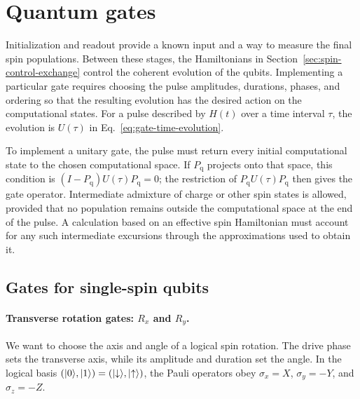 \section{Quantum gates}
\label{sec:quantum-gates}
\label{sec:hamiltonians-to-gates}

Initialization and readout provide a known input and a way to
measure the final spin populations. Between these stages, the
Hamiltonians in Section~\ref{sec:spin-control-exchange} control the
coherent evolution of the qubits. Implementing a particular gate
requires choosing the pulse amplitudes, durations, phases, and
ordering so that the resulting evolution has the desired action
on the computational states. For a pulse described by $H(t)$ over
a time interval $\tau$, the evolution is $U(\tau)$ in
Eq.~\eqref{eq:gate-time-evolution}.

To implement a unitary gate, the pulse must return every initial
computational state to the chosen computational space. If
$P_{\mathrm q}$ projects onto that space, this condition is
$(I-P_{\mathrm q})U(\tau)P_{\mathrm q}=0$; the restriction of
$P_{\mathrm q}U(\tau)P_{\mathrm q}$ then gives the gate operator.
Intermediate admixture of charge or other spin states is allowed,
provided that no population remains outside the computational space
at the end of the pulse. A calculation based on an effective spin
Hamiltonian must account for any such intermediate excursions
through the approximations used to obtain it.

\subsection{Gates for single-spin qubits}
\label{sec:single-qubit-gates}

\paragraph{Transverse rotation gates: \texorpdfstring{$R_x$ and $R_y$}{Rx and Ry}.}
We want to choose the axis and angle of a logical spin rotation.
The drive phase sets the transverse axis, while its amplitude and
duration set the angle.
In the logical basis $(\lvert 0\rangle,\lvert 1\rangle)=(\lvert \downarrow\rangle,\lvert \uparrow\rangle)$,
the Pauli operators obey
$\sigma_x=X$, $\sigma_y=-Y$, and $\sigma_z=-Z$.

